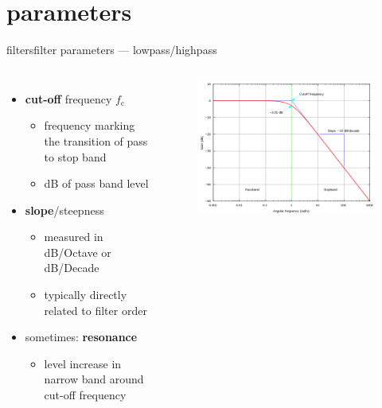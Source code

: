 \section{parameters}
        \begin{frame}{filters}{filter parameters --- lowpass/highpass}
            \vspace{-5mm}
            \begin{columns}
                \begin{itemize}
                    \item   \textbf{cut-off} frequency $f_\mathrm{c}$
                        \begin{itemize}
                            \item   frequency marking the transition of pass to stop band
                            \item   \unit[-3]{dB} of pass band level
                        \end{itemize}
                    \smallskip
                    \item   \textbf{slope}/steepness
                        \begin{itemize}
                            \item   measured in dB/Octave or dB/Decade
                            \item   typically directly related to filter order
                        \end{itemize}
                    \smallskip
                    \item   sometimes: \textbf{resonance}    
                        \begin{itemize}
                            \item   level increase in narrow band around cut-off frequency
                        \end{itemize}
                \end{itemize}
                \begin{figure}%
                    \includegraphics[width=.9\columnwidth]{graph/filter_parameters_lowpass}%

\end{figure}
\end{columns}
\end{frame}
